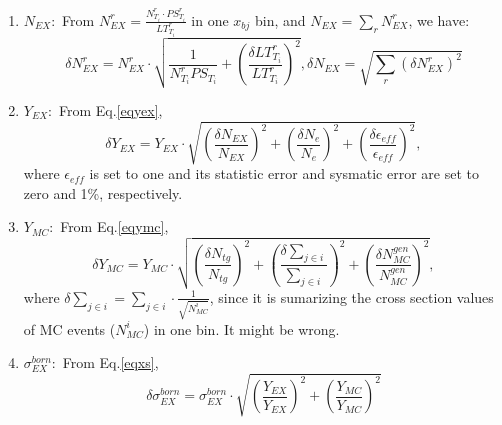 \begin{enumerate}
\item \textbf{$N_{EX}:$} From  $N_{EX}^{r} = \frac{N_{T_{i}}^{r} \cdot PS_{T_{i}}^{r}}{LT_{T_{i}}^{r}}$ in one $x_{bj}$ bin, and $N_{EX}=\sum_{r}N_{EX}^{r}$, we have:
\begin{equation}
  \delta N_{EX}^{r} = N_{EX}^{r} \cdot \sqrt{\frac{1}{N_{T_{i}}^{r} PS_{T_{i}}} + (\frac{\delta LT_{T_{i}}^{r}}{LT_{T_{i}}^{r}})^{2} }, \delta N_{EX}=\sqrt{\sum_{r}(\delta N_{EX}^{r})^{2}}
\end{equation}

\item \textbf{$Y_{EX}:$} From Eq.\ref{eqyex},
\begin{equation}
  \delta Y_{EX} =  Y_{EX} \cdot \sqrt{(\frac{\delta N_{EX}}{N_{EX}})^{2}+(\frac{\delta N_{e}}{N_{e}})^{2}+(\frac{\delta\epsilon_{eff}}{\epsilon_{eff}})^{2}},
\end{equation}
where $\epsilon_{eff}$ is set to one and its statistic error and sysmatic error are set to zero and 1\%, respectively.

\item \textbf{$Y_{MC}:$} From Eq.\ref{eqymc},
\begin{equation}
  \delta Y_{MC} =  Y_{MC} \cdot \sqrt{(\frac{\delta N_{tg}}{N_{tg}})^{2}+(\frac{\delta\sum_{j\in i}}{\sum_{j\in i}})^{2}+(\frac{\delta N_{MC}^{gen}}{N_{MC}^{gen}})^{2}},
\end{equation}
where $\delta\sum_{j\in i} = \sum_{j\in i}\cdot\frac{1}{\sqrt{N_{MC}^{i}}}$, since it is sumarizing the cross section values of MC events ($N_{MC}^{i}$) in one bin. It might be wrong.

\item \textbf{$\sigma_{EX}^{born}:$} From Eq.\ref{eqxs},
  \begin{equation}
  \delta \sigma_{EX}^{born} = \sigma_{EX}^{born} \cdot \sqrt{(\frac{Y_{EX}}{Y_{EX}})^{2}+(\frac{Y_{MC}}{Y_{MC}})^{2}}
\end{equation}

\end{enumerate}


